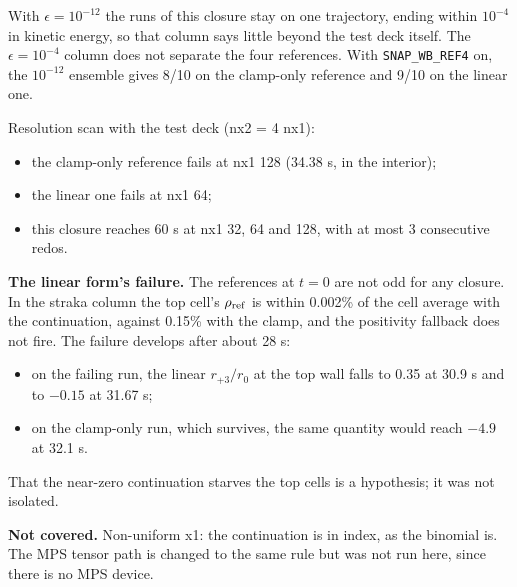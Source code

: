 \documentclass[11pt,a4paper]{article}
\begin{document}
With $\epsilon = 10^{-12}$ the runs of this closure stay on one trajectory, ending within $10^{-4}$ in kinetic
energy, so that column says little beyond the test deck itself. The $\epsilon = 10^{-4}$ column does not separate
the four references. With \texttt{SNAP\_WB\_REF4} on, the $10^{-12}$ ensemble gives 8/10 on the clamp-only reference and
9/10 on the linear one.

Resolution scan with the test deck (nx2 = 4 nx1):
\begin{itemize}
\item the clamp-only reference fails at nx1 128 (34.38 s, in the interior);
\item the linear one fails at nx1 64;
\item this closure reaches 60 s at nx1 32, 64 and 128, with at most 3 consecutive redos.
\end{itemize}

\textbf{The linear form's failure.} The references at $t = 0$ are not odd for any closure. In the straka column the top
cell's $\rho_{\rm ref}$ is within 0.002\% of the cell average with the continuation, against 0.15\% with the clamp,
and the positivity fallback does not fire. The failure develops after about 28 s:
\begin{itemize}
\item on the failing run, the linear $r_{+3}/r_0$ at the top wall falls to 0.35 at 30.9 s and to $-0.15$ at 31.67 s;
\item on the clamp-only run, which survives, the same quantity would reach $-4.9$ at 32.1 s.
\end{itemize}

That the near-zero continuation starves the top cells is a hypothesis; it was not isolated.

\textbf{Not covered.} Non-uniform x1: the continuation is in index, as the binomial is. The MPS tensor path is changed
to the same rule but was not run here, since there is no MPS device.
\end{document}
